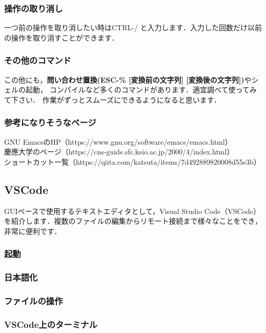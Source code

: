 \documentclass{jarticle}
\begin{document}
\subsubsection{操作の取り消し}
一つ前の操作を取り消したい時はCTRL-/ と入力します．入力した回数だけ以前
の操作を取り消すことができます．

\subsubsection{その他のコマンド}
この他にも，{\bf 問い合わせ置換(ESC-\% [変換前の文字列] [変換後の文字列])}やシェルの起動，
コンパイルなど多くのコマンドがあります．適宜調べて使ってみて下さい．
作業がずっとスムーズにできるようになると思います．

\subsubsection{参考になりそうなページ}
GNU EmacsのHP（https://www.gnu.org/software/emacs/emacs.html） \\
慶應大学のページ（https://cns-guide.sfc.keio.ac.jp/2000/4/index.html）\\
ショートカット一覧（https://qiita.com/katsuta/items/7d492889820008d55e3b）

\subsection{VSCode}
GUIベースで使用するテキストエディタとして，Visual Studio Code（VSCode）を紹介します．複数のファイルの編集からリモート接続まで様々なことをでき，非常に便利です．

\subsubsection{起動}

\subsubsection{日本語化}

\subsubsection{ファイルの操作}

\subsubsection{VSCode上のターミナル}
\end{document}
